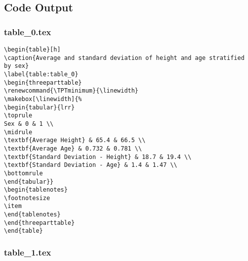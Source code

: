 \documentclass[11pt]{article}
\begin{document}
\subsection{Code Output}

\subsubsection*{table\_0.tex}

\begin{Verbatim}[tabsize=4]
\begin{table}[h]
\caption{Average and standard deviation of height and age stratified by sex}
\label{table:table_0}
\begin{threeparttable}
\renewcommand{\TPTminimum}{\linewidth}
\makebox[\linewidth]{%
\begin{tabular}{lrr}
\toprule
Sex & 0 & 1 \\
\midrule
\textbf{Average Height} & 65.4 & 66.5 \\
\textbf{Average Age} & 0.732 & 0.781 \\
\textbf{Standard Deviation - Height} & 18.7 & 19.4 \\
\textbf{Standard Deviation - Age} & 1.4 & 1.47 \\
\bottomrule
\end{tabular}}
\begin{tablenotes}
\footnotesize
\item
\end{tablenotes}
\end{threeparttable}
\end{table}

\end{Verbatim}

\subsubsection*{table\_1.tex}
\end{document}
